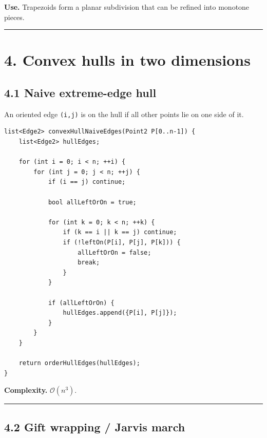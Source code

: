 \documentclass[11pt]{article}
\begin{document}
\textbf{Use.} Trapezoids form a planar subdivision that can be refined
into monotone pieces.

\begin{center}\rule{0.5\linewidth}{0.5pt}\end{center}

\section{4. Convex hulls in two
dimensions}\label{convex-hulls-in-two-dimensions}

\subsection{4.1 Naive extreme-edge hull}\label{naive-extreme-edge-hull}

An oriented edge \texttt{(i,j)} is on the hull if all
other points lie on one side of it.

\begin{verbatim}
list<Edge2> convexHullNaiveEdges(Point2 P[0..n-1]) {
    list<Edge2> hullEdges;

    for (int i = 0; i < n; ++i) {
        for (int j = 0; j < n; ++j) {
            if (i == j) continue;

            bool allLeftOrOn = true;

            for (int k = 0; k < n; ++k) {
                if (k == i || k == j) continue;
                if (!leftOn(P[i], P[j], P[k])) {
                    allLeftOrOn = false;
                    break;
                }
            }

            if (allLeftOrOn) {
                hullEdges.append({P[i], P[j]});
            }
        }
    }

    return orderHullEdges(hullEdges);
}
\end{verbatim}

\textbf{Complexity.} \(\mathcal{O}(n^3)\).

\begin{center}\rule{0.5\linewidth}{0.5pt}\end{center}

\subsection{4.2 Gift wrapping / Jarvis
march}\label{gift-wrapping-jarvis-march}
\end{document}
